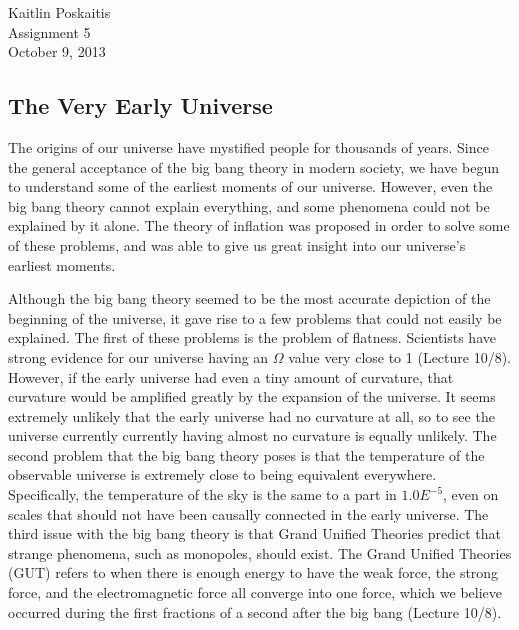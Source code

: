 \documentclass[12pt]{article}
\begin{document}
\noindent Kaitlin Poskaitis\\
Assignment 5\\
October 9, 2013
\begin{center}
    \section*{\bf The Very Early Universe}
\end{center}

The origins of our universe have mystified people for thousands of years.  Since
the general acceptance of the big bang theory in modern society, we have begun
to understand some of the earliest moments of our universe.  However, even the
big bang theory cannot explain everything, and some phenomena could not be
explained by it alone.  The theory of inflation was proposed in order to solve
some of these problems, and was able to give us great insight into our
universe's earliest moments.

Although the big bang theory seemed to be the most accurate depiction of the
beginning of the universe, it gave rise to a few problems that could not easily
be explained.  The first of these problems is the problem of flatness.
Scientists have strong evidence for our universe having an $\Omega$ value very
close to 1 (Lecture 10/8).  However, if the early universe had even a tiny
amount of curvature,
that curvature would be amplified greatly by the expansion of the universe. It
seems extremely unlikely that the early universe had no curvature at all, so to
see the universe currently currently having almost no curvature is equally
unlikely.  The second problem that the big bang theory poses is that the
temperature of the observable universe is extremely close to being equivalent
everywhere.  Specifically, the temperature of the sky is the same to a part in
$1.0E^{-5}$, even on scales that should not have been causally connected in the
early universe.  The third issue with the big bang theory is that Grand Unified
Theories
predict that strange phenomena, such as monopoles, should exist.  The Grand
Unified Theories (GUT) refers to when there is enough energy to have the weak
force, the strong force, and the electromagnetic force all converge into one
force, which we believe occurred during the first fractions of a second after the
big bang (Lecture 10/8).
\end{document}
